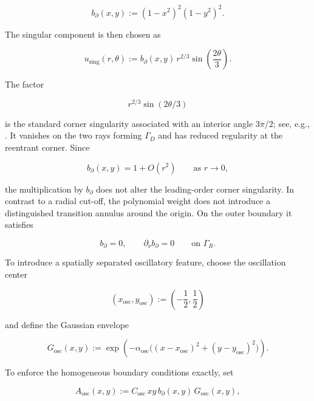 \begin{equation}
\label{eq:lshape-boundary-weight}
  b_{\partial}(x,y)
  :=
  (1-x^2)^2(1-y^2)^2.
\end{equation}

The singular component is then chosen as

\begin{equation}
\label{eq:lshape-singularity}
  u_{\mathrm{sing}}(r,\theta)
  :=
  b_{\partial}(x,y)\,
  r^{2/3}
  \sin\!\left(\frac{2\theta}{3}\right).
\end{equation}

The factor

\[
  r^{2/3}\sin(2\theta/3)
\]

is the standard corner singularity associated with an interior angle
$3\pi/2$; see, e.g., \cite{BrennerScott2008}. It vanishes on the two rays
forming $\Gamma_D$ and has reduced regularity at the reentrant corner.
Since

\[
  b_{\partial}(x,y)=1+O(r^2)
  \qquad\text{as }r\to0,
\]

the multiplication by $b_{\partial}$ does not alter the leading-order
corner singularity. In contrast to a radial cut-off, the polynomial
weight does not introduce a distinguished transition annulus around the
origin. On the outer boundary it satisfies

\[
  b_{\partial}=0,
  \qquad
  \partial_\nu b_{\partial}=0
  \qquad\text{on }\Gamma_R.
\]

To introduce a spatially separated oscillatory feature, choose the
oscillation center

\begin{equation}
\label{eq:lshape-oscillation-center}
  (x_{\mathrm{osc}},y_{\mathrm{osc}})
  :=
  \left(-\frac12,\frac12\right)
\end{equation}

and define the Gaussian envelope

\begin{equation}
\label{eq:lshape-oscillation-envelope}
  G_{\mathrm{osc}}(x,y)
  :=
  \exp\!\left(
    -\alpha_{\mathrm{osc}}
    \bigl(
      (x-x_{\mathrm{osc}})^2
      +(y-y_{\mathrm{osc}})^2
    \bigr)
  \right).
\end{equation}

To enforce the homogeneous boundary conditions exactly, set

\begin{equation}
\label{eq:lshape-oscillation-amplitude}
  A_{\mathrm{osc}}(x,y)
  :=
  C_{\mathrm{osc}}\,
  xy\,
  b_{\partial}(x,y)\,
  G_{\mathrm{osc}}(x,y),
\end{equation}

